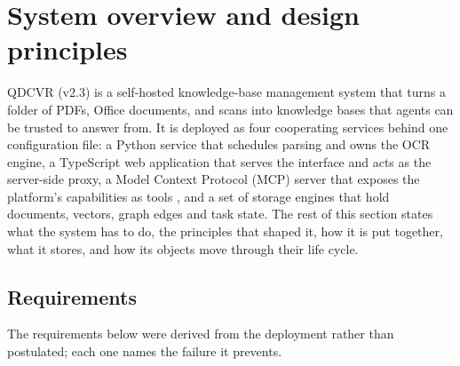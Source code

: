 \section{System overview and design principles}
\label{sec:system}

QDCVR (v2.3) is a self-hosted knowledge-base management system that turns a
folder of PDFs, Office documents, and scans into knowledge bases that agents
can be trusted to answer from. It is deployed as four cooperating services
behind one configuration file: a Python service that schedules parsing and
owns the OCR engine, a TypeScript web application that serves the interface
and acts as the server-side proxy, a Model Context Protocol (MCP) server that
exposes the platform's capabilities as tools \cite{mcp}, and a set of storage
engines that hold documents, vectors, graph edges and task state. The rest of
this section states what the system has to do, the principles that shaped it,
how it is put together, what it stores, and how its objects move through their
life cycle.

\subsection{Requirements}
\label{sec:req}

The requirements below were derived from the deployment rather than
postulated; each one names the failure it prevents.

